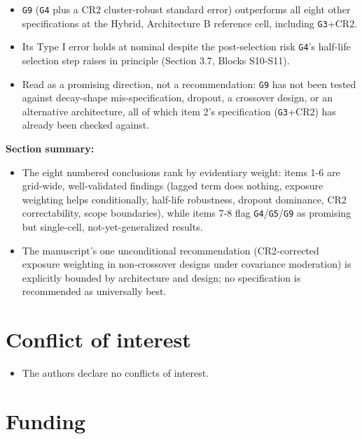 \documentclass[
  11pt,
]{article}
\providecommand{\tightlist}{%
  \setlength{\itemsep}{0pt}\setlength{\parskip}{0pt}}
\begin{document}
\begin{enumerate}
  \begin{itemize}
  \tightlist
  \item
    \texttt{G9} (\texttt{G4} plus a CR2 cluster-robust standard error) outperforms
    all eight other specifications at the Hybrid, Architecture B
    reference cell, including \texttt{G3}+CR2.
  \item
    Its Type I error holds at nominal despite the post-selection risk
    \texttt{G4}'s half-life selection step raises in principle (Section
    3.7, Blocks S10-S11).
  \item
    Read as a promising direction, not a recommendation: \texttt{G9} has not
    been tested against decay-shape mis-specification, dropout, a
    crossover design, or an alternative architecture, all of which
    item 2's specification (\texttt{G3}+CR2) has already been checked
    against.
  \end{itemize}
\end{enumerate}

\textbf{Section summary:}

\begin{itemize}
\tightlist
\item
  The eight numbered conclusions rank by evidentiary weight: items
  1-6 are grid-wide, well-validated findings (lagged term does
  nothing, exposure weighting helps conditionally, half-life
  robustness, dropout dominance, CR2 correctability, scope
  boundaries), while items 7-8 flag \texttt{G4}/\texttt{G5}/\texttt{G9} as promising but
  single-cell, not-yet-generalized results.
\item
  The manuscript's one unconditional recommendation (CR2-corrected
  exposure weighting in non-crossover designs under covariance
  moderation) is explicitly bounded by architecture and design; no
  specification is recommended as universally best.
\end{itemize}

\section{Conflict of interest}\label{conflict-of-interest}

\begin{itemize}
\tightlist
\item
  The authors declare no conflicts of interest.
\end{itemize}

\section{Funding}\label{funding}
\end{document}
